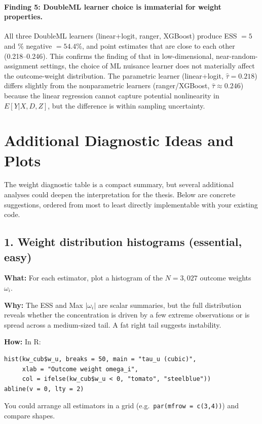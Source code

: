 \documentclass[12pt, a4paper]{article}
\begin{document}
\paragraph{Finding 5: DoubleML learner choice is immaterial for weight properties.}
All three DoubleML learners (linear+logit, ranger, XGBoost) produce ESS $= 5$
and \% negative $= 54.4$\%, and point estimates that are close to each other
(0.218--0.246). This confirms the finding of \citet[][Table~6]{knaus2024outcome}
that in low-dimensional, near-random-assignment settings, the choice of ML
nuisance learner does not materially affect the outcome-weight distribution.
The parametric learner (linear+logit, $\hat{\tau} = 0.218$) differs slightly
from the nonparametric learners (ranger/XGBoost, $\hat{\tau} \approx 0.246$)
because the linear regression cannot capture potential nonlinearity in
$E[Y|X, D, Z]$, but the difference is within sampling uncertainty.

\clearpage
\section*{Additional Diagnostic Ideas and Plots}

The weight diagnostic table is a compact summary, but several additional
analyses could deepen the interpretation for the thesis. Below are concrete
suggestions, ordered from most to least directly implementable with your
existing code.

\subsection*{1. Weight distribution histograms (essential, easy)}

\textbf{What:} For each estimator, plot a histogram of the $N = 3{,}027$
outcome weights $\omega_i$.

\textbf{Why:} The ESS and Max $|\omega_i|$ are scalar summaries, but the
full distribution reveals whether the concentration is driven by a few extreme
observations or is spread across a medium-sized tail. A fat right tail
suggests instability.

\textbf{How:} In R:
\begin{verbatim}
hist(kw_cub$w_u, breaks = 50, main = "tau_u (cubic)",
     xlab = "Outcome weight omega_i",
     col = ifelse(kw_cub$w_u < 0, "tomato", "steelblue"))
abline(v = 0, lty = 2)
\end{verbatim}
You could arrange all estimators in a grid (e.g.\ \texttt{par(mfrow = c(3,4))})
and compare shapes.
\end{document}
